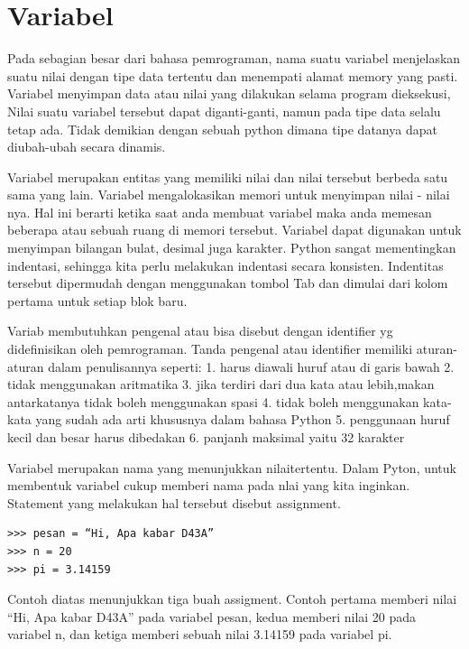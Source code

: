 
\section{Variabel}
Pada sebagian besar dari bahasa pemrograman, nama suatu variabel
menjelaskan suatu nilai dengan tipe data tertentu 
dan menempati alamat memory yang pasti.
Variabel menyimpan data atau nilai yang dilakukan selama program dieksekusi,
Nilai suatu variabel tersebut dapat diganti-ganti, namun pada tipe data selalu tetap ada.
Tidak demikian dengan sebuah python dimana tipe datanya dapat diubah-ubah
secara dinamis\cite{suparno2013komputasi}.

Variabel merupakan entitas yang memiliki nilai dan nilai tersebut berbeda satu sama yang lain. Variabel mengalokasikan memori untuk menyimpan nilai - nilai nya.
Hal ini berarti ketika saat anda membuat variabel maka anda memesan beberapa atau sebuah ruang di memori tersebut. 
Variabel dapat digunakan untuk menyimpan bilangan bulat, desimal juga karakter.
Python sangat mementingkan indentasi, sehingga kita perlu melakukan indentasi secara konsisten. 
Indentitas tersebut dipermudah dengan menggunakan tombol Tab dan dimulai dari kolom pertama untuk setiap blok baru.

Variab membutuhkan pengenal atau bisa disebut dengan identifier yg didefinisikan oleh pemrograman. Tanda pengenal atau identifier memiliki aturan-aturan dalam penulisannya seperti:
1. harus diawali huruf atau di garis bawah
2. tidak menggunakan aritmatika
3. jika terdiri dari dua kata atau lebih,makan antarkatanya tidak boleh menggunakan spasi
4. tidak boleh menggunakan kata-kata yang sudah ada arti khususnya dalam bahasa Python
5. penggunaan huruf kecil dan besar harus dibedakan
6. panjanh maksimal yaitu 32 karakter

Variabel merupakan nama yang menunjukkan nilaitertentu. Dalam Pyton, untuk membentuk variabel cukup memberi nama pada nlai yang kita inginkan. Statement yang melakukan hal tersebut disebut assignment.
\begin{verbatim}
>>> pesan = “Hi, Apa kabar D43A”
>>> n = 20
>>> pi = 3.14159
\end{verbatim}
Contoh diatas menunjukkan tiga buah assigment. Contoh pertama memberi nilai “Hi, Apa kabar D43A” pada variabel pesan, kedua memberi nilai 20 pada variabel n, dan ketiga memberi sebuah nilai 3.14159 pada variabel pi.\cite{utami2004logika}

